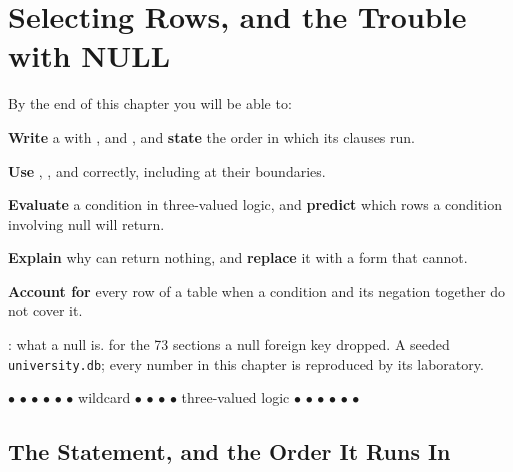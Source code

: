 \chapter{Selecting Rows, and the Trouble with NULL}\label{ch:select}

\begin{outcomes}
By the end of this chapter you will be able to:
\begin{tight}
  \item \textbf{Write} a  with , 
        and , and \textbf{state} the order in which its clauses
        run.
  \item \textbf{Use} , ,  and
         correctly, including at their boundaries.
  \item \textbf{Evaluate} a condition in three-valued logic, and
        \textbf{predict} which rows a condition involving null will return.
  \item \textbf{Explain} why  can return nothing, and
        \textbf{replace} it with a form that cannot.
  \item \textbf{Account for} every row of a table when a condition and its
        negation together do not cover it.
\end{tight}
\end{outcomes}

\begin{prereq}
: what a null is.  for the 73 sections a null
foreign key dropped. A seeded \texttt{university.db}; every number in this
chapter is reproduced by its laboratory.
\end{prereq}

\begin{keyterms}
 $\bullet$  $\bullet$  $\bullet$
 $\bullet$  $\bullet$
 $\bullet$ wildcard $\bullet$  $\bullet$
 $\bullet$  $\bullet$ three-valued logic $\bullet$
\unk{} $\bullet$  $\bullet$ 
$\bullet$  $\bullet$  $\bullet$ 
\end{keyterms}

\section{The Statement, and the Order It Runs In}

